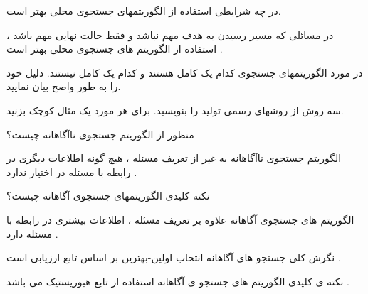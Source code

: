 \documentclass[12pt]{article}
\begin{document}
\vspace{20pt}
\noindent
در چه شرایطی استفاده از الگوریتمهای جستجوی محلی بهتر است.


\begin{tcolorbox}
در مسائلی که مسیر رسیدن به هدف مهم نباشد و فقط حالت نهایی مهم باشد ، استفاده از الگوریتم های جستجوی محلی بهتر است .
\end{tcolorbox}



\vspace{20pt}
\noindent
در مورد الگوریتمهای جستجوی 
کدام یک کامل هستند و کدام یک کامل نیستند. دلیل خود را به طور واضح بیان نمایید.




\vspace{20pt}
\noindent
سه روش از روشهای رسمی تولید 
 را بنویسید. برای هر مورد یک مثال کوچک بزنید.





\newpage
\vspace{20pt}
\noindent
منظور از الگوریتم جستجوی ناآگاهانه چیست؟


\begin{tcolorbox}
الگوریتم جستجوی ناآگاهانه به غیر از تعریف مسئله ، هیچ گونه اطلاعات دیگری در رابطه با مسئله در اختیار ندارد .
\end{tcolorbox}


\vspace{20pt}
\noindent
نکته کلیدی الگوریتمهای جستجوی آگاهانه چیست؟


\begin{tcolorbox}
الگوریتم های جستجوی آگاهانه علاوه بر تعریف مسئله ، اطلاعات بیشتری در رابطه با مسئله دارد .


نگرش کلی جستجو های آگاهانه انتخاب اولین-بهترین 
بر اساس تابع ارزیابی است .
\end{tcolorbox}


\begin{tcolorbox}
نکته ی کلیدی الگوریتم های جستجو ی آگاهانه استفاده از تابع هیوریستیک می باشد .
\end{tcolorbox}
\end{document}
